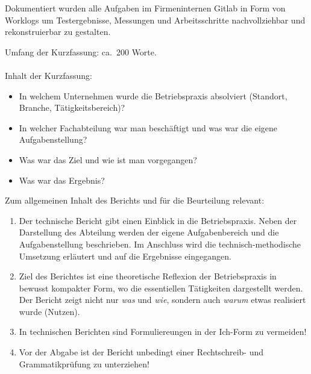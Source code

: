 \documentclass[praktikum,german]{hgbthesis}
\begin{document}
Dokumentiert wurden alle Aufgaben im Firmeninternen Gitlab in Form von 
Worklogs um Testergebnisse, Messungen und Arbeitsschritte nachvollziehbar und rekonstruierbar zu gestalten.



\color{blue}   %
Umfang der Kurzfassung: ca.\ 200 Worte.
\\
\\
Inhalt der Kurzfassung:
\begin{itemize}
\item In welchem Unternehmen wurde die Betriebspraxis absolviert (Standort, Branche, Tätigkeitsbereich)?
\item In welcher Fachabteilung war man beschäftigt und was war die eigene Aufgabenstellung?
\item Was war das Ziel und wie ist man vorgegangen?
\item Was war das Ergebnis?
\end{itemize}

\vskip 15mm

\noindent Zum allgemeinen Inhalt des Berichts und für die Beurteilung relevant:\\

\begin{enumerate}
	\item Der technische Bericht gibt einen Einblick in die Betriebspraxis. Neben der Darstellung des Abteilung werden der eigene Aufgabenbereich und die Aufgabenstellung beschrieben. Im Anschluss wird die technisch-methodische Umsetzung erläutert und auf die Ergebnisse eingegangen.

\item Ziel des Berichtes ist eine theoretische Reflexion der Betriebspraxis in bewusst kompakter Form, wo die essentiellen Tätigkeiten dargestellt werden. Der Bericht zeigt nicht nur \emph{was} und \emph{wie}, sondern auch \emph{warum} etwas realisiert wurde (Nutzen). 

\item In technischen Berichten sind Formuliereungen in der Ich-Form zu vermeiden!

\item Vor der Abgabe ist der Bericht unbedingt einer Rechtschreib- und Grammatikprüfung zu unterziehen!
\end{enumerate}

\color{black}


\mainmatter           %
\end{document}
